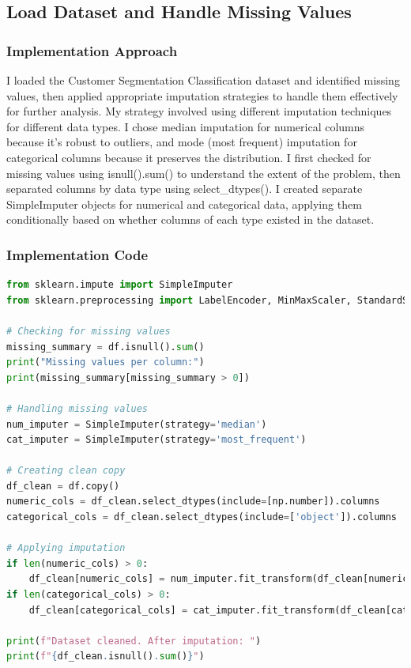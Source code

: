\documentclass[12pt,a4paper]{article}
\begin{document}
\subsection{Load Dataset and Handle Missing Values}

\subsubsection{Implementation Approach}
I loaded the Customer Segmentation Classification dataset and identified missing values, then applied appropriate imputation strategies to handle them effectively for further analysis. My strategy involved using different imputation techniques for different data types. I chose median imputation for numerical columns because it's robust to outliers, and mode (most frequent) imputation for categorical columns because it preserves the distribution. I first checked for missing values using isnull().sum() to understand the extent of the problem, then separated columns by data type using select\_dtypes(). I created separate SimpleImputer objects for numerical and categorical data, applying them conditionally based on whether columns of each type existed in the dataset.

\subsubsection{Implementation Code}
\begin{lstlisting}[language=Python, caption=Handle Missing Values]
from sklearn.impute import SimpleImputer
from sklearn.preprocessing import LabelEncoder, MinMaxScaler, StandardScaler

# Checking for missing values
missing_summary = df.isnull().sum()
print("Missing values per column:")
print(missing_summary[missing_summary > 0])

# Handling missing values
num_imputer = SimpleImputer(strategy='median')
cat_imputer = SimpleImputer(strategy='most_frequent')

# Creating clean copy
df_clean = df.copy()
numeric_cols = df_clean.select_dtypes(include=[np.number]).columns
categorical_cols = df_clean.select_dtypes(include=['object']).columns

# Applying imputation
if len(numeric_cols) > 0:
    df_clean[numeric_cols] = num_imputer.fit_transform(df_clean[numeric_cols])
if len(categorical_cols) > 0:
    df_clean[categorical_cols] = cat_imputer.fit_transform(df_clean[categorical_cols])

print(f"Dataset cleaned. After imputation: ")
print(f"{df_clean.isnull().sum()}")
\end{lstlisting}
\end{document}
